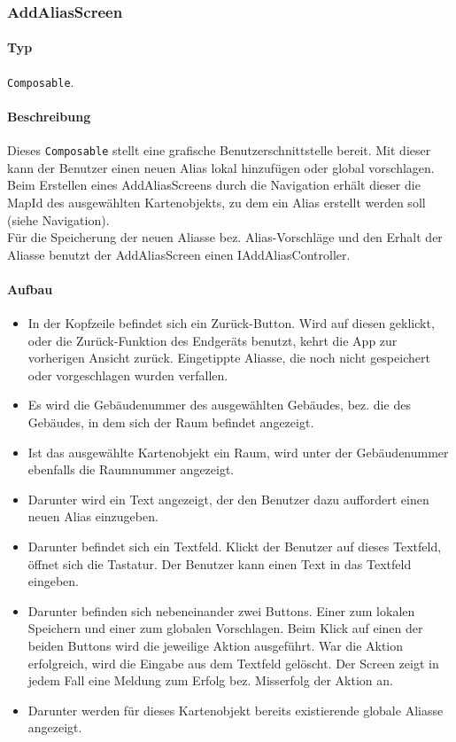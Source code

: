 \subsubsection{AddAliasScreen}\label{App_AddAlias_AddAliasScreen}
\paragraph*{Typ}
\texttt{Composable}.
\paragraph*{Beschreibung}
Dieses \texttt{Composable} stellt eine grafische Benutzerschnittstelle bereit.
Mit dieser kann der Benutzer einen neuen Alias lokal hinzufügen oder global vorschlagen.\\
Beim Erstellen eines AddAliasScreens durch die Navigation erhält dieser die MapId 
des ausgewählten Kartenobjekts, zu dem ein Alias erstellt werden soll (siehe Navigation).\\
Für die Speicherung der neuen Aliasse bez. Alias-Vorschläge und den Erhalt der Aliasse benutzt 
der AddAliasScreen einen IAddAliasController.

\paragraph*{Aufbau}
\begin{itemize}
    \item In der Kopfzeile befindet sich ein Zurück-Button. Wird auf diesen geklickt, oder die Zurück-Funktion des Endgeräts benutzt, 
    kehrt die App zur vorherigen Ansicht zurück. Eingetippte Aliasse, die noch nicht gespeichert oder vorgeschlagen wurden verfallen.
    \item Es wird die Gebäudenummer des ausgewählten Gebäudes, bez. die des Gebäudes, in dem sich der Raum befindet angezeigt.
    \item Ist das ausgewählte Kartenobjekt ein Raum, wird unter der Gebäudenummer ebenfalls die Raumnummer angezeigt.
    \item Darunter wird ein Text angezeigt, der den Benutzer dazu auffordert einen neuen Alias einzugeben.
    \item Darunter befindet sich ein Textfeld. Klickt der Benutzer auf dieses Textfeld, öffnet sich die Tastatur. 
    Der Benutzer kann einen Text in das Textfeld eingeben.
    \item Darunter befinden sich nebeneinander zwei Buttons. Einer zum lokalen Speichern und einer zum globalen Vorschlagen. 
    Beim Klick auf einen der beiden Buttons wird die jeweilige Aktion ausgeführt. War die Aktion erfolgreich, wird die Eingabe 
    aus dem Textfeld gelöscht. Der Screen zeigt in jedem Fall eine Meldung zum Erfolg bez. Misserfolg der Aktion an.
    \item Darunter werden für dieses Kartenobjekt bereits existierende globale Aliasse angezeigt.
\end{itemize}

